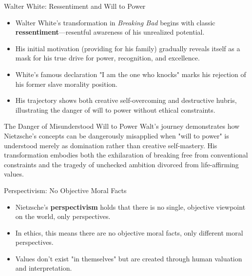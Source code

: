 \documentclass{beamer}
\begin{document}
\begin{frame}{Walter White: Ressentiment and Will to Power}
    \begin{itemize}
    \item Walter White's transformation in \textit{Breaking Bad} begins with classic \textbf{ressentiment}—resentful awareness of his unrealized potential.
    \item His initial motivation (providing for his family) gradually reveals itself as a mask for his true drive for power, recognition, and excellence.
    \item White's famous declaration "I am the one who knocks" marks his rejection of his former slave morality position.
    \item His trajectory shows both creative self-overcoming and destructive hubris, illustrating the danger of will to power without ethical constraints.
    \end{itemize}
    
    \begin{block}{The Danger of Misunderstood Will to Power}
    Walt's journey demonstrates how Nietzsche's concepts can be dangerously misapplied when "will to power" is understood merely as domination rather than creative self-mastery. His transformation embodies both the exhilaration of breaking free from conventional constraints and the tragedy of unchecked ambition divorced from life-affirming values.
    \end{block}
    \end{frame}

\begin{frame}{Perspectivism: No Objective Moral Facts}
\begin{itemize}
\small
\item Nietzsche's \textbf{perspectivism} holds that there is no single, objective viewpoint on the world, only perspectives.
\item In ethics, this means there are no objective moral facts, only different moral perspectives.
\item Values don't exist "in themselves" but are created through human valuation and interpretation.
\end{itemize}

\begin{center}
\end{center}
\end{frame}
\end{document}
